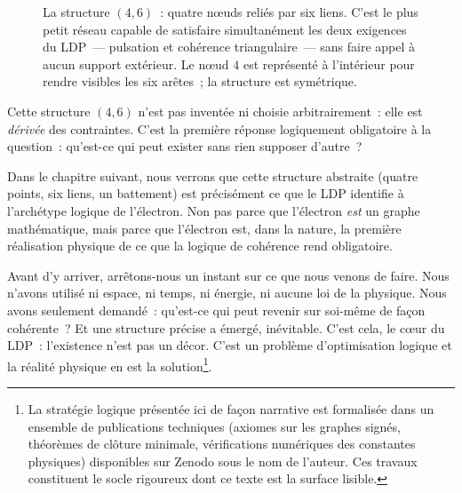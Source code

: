 \documentclass[12pt, a4paper, openright]{book}
\begin{document}
\begin{figure}[h]
\centering
{}
\caption{\small La structure $(4,6)$~: quatre n\oe{}uds reliés par six liens. C'est le plus petit réseau capable de satisfaire simultanément les deux exigences du LDP~--- pulsation et cohérence triangulaire~--- sans faire appel à aucun support extérieur. Le n\oe{}ud $4$ est représenté à l'intérieur pour rendre visibles les six arêtes~; la structure est symétrique.}
\label{fig:46}
\end{figure}

\medskip

Cette structure $(4,6)$ n'est pas inventée ni choisie arbitrairement~: elle est \emph{dérivée} des contraintes. C'est la première réponse logiquement obligatoire à la question~: qu'est-ce qui peut exister sans rien supposer d'autre~?

\medskip

Dans le chapitre suivant, nous verrons que cette structure abstraite (quatre points, six liens, un battement) est précisément ce que le LDP identifie à l'archétype logique de l'électron. Non pas parce que l'électron \emph{est} un graphe mathématique, mais parce que l'électron est, dans la nature, la première réalisation physique de ce que la logique de cohérence rend obligatoire.

\medskip

Avant d'y arriver, arrêtons-nous un instant sur ce que nous venons de faire. Nous n'avons utilisé ni espace, ni temps, ni énergie, ni aucune loi de la physique. Nous avons seulement demandé~: qu'est-ce qui peut revenir sur soi-même de façon cohérente~? Et une structure précise a émergé, inévitable. C'est cela, le c\oe{}ur du LDP~: l'existence n'est pas un décor. C'est un problème d'optimisation logique et la réalité physique en est la solution\footnote{La stratégie logique présentée ici de façon narrative est formalisée dans un ensemble de publications techniques (axiomes sur les graphes signés, théorèmes de clôture minimale, vérifications numériques des constantes physiques) disponibles sur Zenodo sous le nom de l'auteur. Ces travaux constituent le socle rigoureux dont ce texte est la surface lisible.}. 
\end{document}
